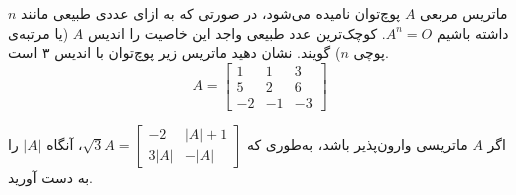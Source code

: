 \begin{problem} \label{prmat11}
	ماتریس مربعی $A$ پوچ‌توان نامیده می‌شود، در صورتی که به ازای عددی طبیعی مانند $n$ داشته باشیم
	$A^n=O$.
	کوچک‌ترین عدد طبیعی واجد این خاصیت را اندیس $A$ (یا مرتبه‌ی پوچی $n$) گویند. نشان دهید ماتریس زیر پوچ‌توان با اندیس ۳ است.
	\[
	A=
	\begin{bmatrix}
		1 & 1 & 3 \\
		5 & 2 & 6 \\
		-2 & -1 & -3
	\end{bmatrix}
	\]
\end{problem}

\begin{problem} \label{prmat12}
	اگر $A$ ماتریسی وارون‌پذیر باشد، به‌طوری که
	$\sqrt{3}A =
	\begin{bmatrix}
		-2 & |A|+1 \\
		3|A| & -|A|
	\end{bmatrix}$،
	آنگاه $|A|$ را به دست آورید.
\end{problem}

